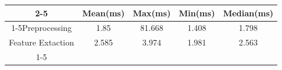 \documentclass{standalone}
\begin{document}
 
 \begin{tabular}{|c |c |c |c |c |}
\cline{2-5}\cline{2-5} \multicolumn{1}{c |}{ } & Mean(ms) & Max(ms) & Min(ms) & Median(ms)\\ 
\cline{1-5}Preprocessing & 1.85 & 81.668 & 1.408 & 1.798\\ 
 \hhline{|=|=|=|=|=|}Feature Extaction & 2.585 & 3.974 & 1.981 & 2.563\\ 
 \cline{1-5}\hline \end{tabular}
 
\end{document}
